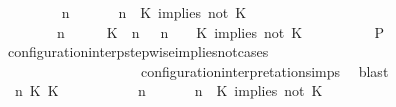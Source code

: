 \begin{isabellebody}
\ \ \ \ \ \ \isamarkupfalse%
\ {\isacartoucheopen}{\isacharparenleft}{\isasymGamma}\ n\ {\isasymturnstile}\ {\isasymPsi}\ {\isasymtriangleright}\ {\isasymPhi}\ {\isacharequal}\ {\isacharparenleft}{\isasymGamma}{\isacharcomma}\ n\ {\isasymturnstile}\ {\isacharparenleft}{\isacharparenleft}K\ implies\ not\ K\ {\isacharhash}\ {\isasymPsi}{\isacharparenright}\ {\isasymtriangleright}\ {\isasymPhi}{\isacharparenright}{\isacartoucheclose}\isanewline
\ \ \ \ \ \ \ {\isacartoucheopen}{\isacharparenleft}{\isasymGamma}\ n\ {\isasymturnstile}\ {\isasymPsi}\ {\isasymtriangleright}\ {\isasymPhi}\ {\isacharequal}\ {\isacharparenleft}{\isacharparenleft}{\isacharparenleft}K\ {\isasymnot}{\isasymUp}\ n{\isacharparenright}\ {\isacharhash}\ {\isasymGamma}{\isacharparenright}{\isacharcomma}\ n\ {\isasymturnstile}\ {\isasymPsi}\ {\isasymtriangleright}\ {\isacharparenleft}{\isacharparenleft}K\ implies\ not\ K\ {\isacharhash}\ {\isasymPhi}{\isacharparenright}{\isacharparenright}{\isacartoucheclose}\isanewline
\ \ \ \ \ \ \isamarkupfalse%
\ {\isacharquery}P\ \isamarkupfalse%
\ configuration{\isacharunderscore}interp{\isacharunderscore}stepwise{\isacharunderscore}implies{\isacharunderscore}not{\isacharunderscore}cases\isanewline
\ \ \ \ \ \ \ \ \ \ \ \ \ \ \ \ \ \ \ \ configuration{\isacharunderscore}interpretation{\isachardot}simps\ \isamarkupfalse%
\ blast\isanewline
\ \ \ \ \isamarkupfalse%
\isanewline
\ \ \ \ \ \ \isamarkupfalse%
\ {\isasymGamma}\ n\ K\ K\ {\isasymPsi}\ {\isasymPhi}\isanewline
\ \ \ \ \ \ \isamarkupfalse%
\ {\isacartoucheopen}{\isacharparenleft}{\isasymGamma}\ n\ {\isasymturnstile}\ {\isasymPsi}\ {\isasymtriangleright}\ {\isasymPhi}\ {\isacharequal}\ {\isacharparenleft}{\isasymGamma}{\isacharcomma}\ n\ {\isasymturnstile}\ {\isacharparenleft}{\isacharparenleft}K\ implies\ not\ K\ {\isacharhash}\ {\isasymPsi}{\isacharparenright}\ {\isasymtriangleright}\ {\isasymPhi}{\isacharparenright}{\isacartoucheclose}\isanewline

\end{isabellebody}
